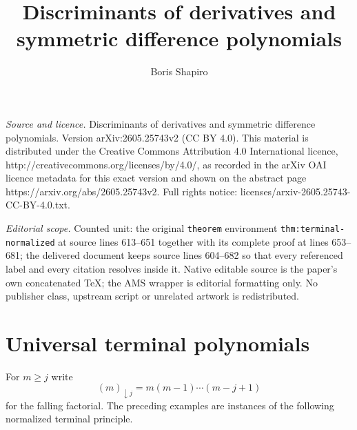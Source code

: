 \documentclass[10pt,a4paper]{amsart}
\numberwithin{equation}{section}
\begin{document}
\title[Discriminants of derivatives and symmetric difference polyno]{Discriminants of derivatives and symmetric difference polynomials}
\author{Boris Shapiro}
\date{}
\maketitle
\noindent\emph{Source and licence.} Discriminants of derivatives and symmetric difference polynomials. Version arXiv:2605.25743v2 (CC BY 4.0). This material is distributed under the Creative Commons Attribution 4.0 International licence, http://creativecommons.org/licenses/by/4.0/, as recorded in the arXiv OAI licence metadata for this exact version and shown on the abstract page https://arxiv.org/abs/2605.25743v2. Full rights notice: licenses/arxiv-2605.25743-CC-BY-4.0.txt.\par\smallskip
\noindent\textit{Editorial scope.} Counted unit: the original \texttt{theorem} environment \texttt{thm:terminal-normalized} at source lines 613--651 together with its complete proof at lines 653--681; the delivered document keeps source lines 604--682 so that every referenced label and every citation resolves inside it. Native editable source is the paper's own concatenated TeX; the AMS wrapper is editorial formatting only. No publisher class, upstream script or unrelated artwork is redistributed.
\section{Universal terminal polynomials}

For $m\ge j$ write
\[
(m)_{\downarrow j}=m(m-1)\cdots(m-j+1)
\]
for the falling factorial.  The preceding examples are instances of the
following normalized terminal principle.
\end{document}
